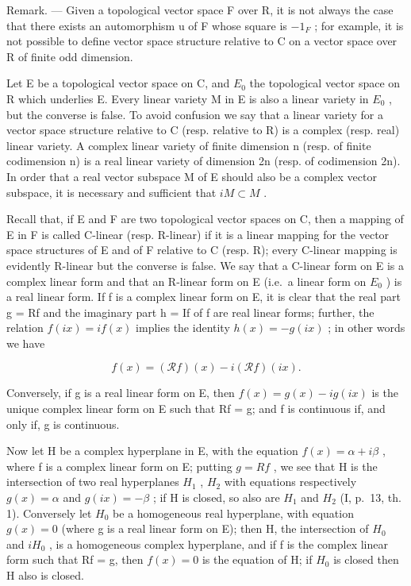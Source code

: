 Remark. --- Given a topological vector space F over R, it is not always the case that there exists an automorphism u of F whose square is \(-1_{F}\) ; for example, it is not possible to define vector space structure relative to C on a vector space over R of finite odd dimension.

Let E be a topological vector space on C, and \(E_{0}\) the topological vector space on R which underlies E. Every linear variety M in E is also a linear variety in \(E_{0}\) , but the converse is false. To avoid confusion we say that a linear variety for a vector space structure relative to C (resp. relative to R) is a complex (resp. real) linear variety. A complex linear variety of finite dimension n (resp. of finite codimension n) is a real linear variety of dimension 2n (resp. of codimension 2n). In order that a real vector subspace M of E should also be a complex vector subspace, it is necessary and sufficient that \(iM \subset M\) .

Recall that, if E and F are two topological vector spaces on C, then a mapping of E in F is called C-linear (resp. R-linear) if it is a linear mapping for the vector space structures of E and of F relative to C (resp. R); every C-linear mapping is evidently R-linear but the converse is false. We say that a C-linear form on E is a complex linear form and that an R-linear form on E (i.e.~a linear form on \(E_{0}\) ) is a real linear form. If f is a complex linear form on E, it is clear that the real part g = Rf and the imaginary part h = If of f are real linear forms; further, the relation \(f(ix) = if(x)\) implies the identity \(h(x) = -g(ix)\) ; in other words we have

\[
f (x) = (\mathscr {R} f) (x) - i (\mathscr {R} f) (i x).\tag{1}
\]

Conversely, if g is a real linear form on E, then \(f(x) = g(x) - ig(ix)\) is the unique complex linear form on E such that Rf = g; and f is continuous if, and only if, g is continuous.

Now let H be a complex hyperplane in E, with the equation \(f(x) = \alpha + i\beta\) , where f is a complex linear form on E; putting \(g = Rf\) , we see that H is the intersection of two real hyperplanes \(H_{1}\) , \(H_{2}\) with equations respectively \(g(x) = \alpha\) and \(g(ix) = -\beta\) ; if H is closed, so also are \(H_{1}\) and \(H_{2}\) (I, p.~13, th. 1). Conversely let \(H_{0}\) be a homogeneous real hyperplane, with equation \(g(x) = 0\) (where g is a real linear form on E); then H, the intersection of \(H_{0}\) and \(iH_{0}\) , is a homogeneous complex hyperplane, and if f is the complex linear form such that Rf = g, then \(f(x) = 0\) is the equation of H; if \(H_{0}\) is closed then H also is closed.

